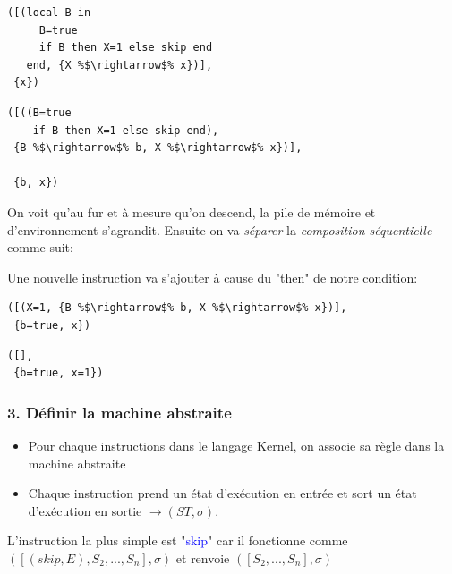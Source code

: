 \documentclass{report}
\begin{document}
\begin{minipage}[t]{0.45\linewidth}
\begin{lstlisting}[escapechar=\%]
([(local B in
     B=true
     if B then X=1 else skip end
   end, {X %$\rightarrow$% x})],
 {x})
\end{lstlisting}
\end{minipage}
%
\begin{minipage}[t]{0.45\linewidth}
\begin{lstlisting}[escapechar=\%]
([((B=true
    if B then X=1 else skip end),
 {B %$\rightarrow$% b, X %$\rightarrow$% x})],
 
 {b, x})
\end{lstlisting}
\end{minipage}

On voit qu'au fur et à mesure qu'on descend, la pile de mémoire et d'environnement s'agrandit. Ensuite on va \textit{séparer} la \textit{composition séquentielle} comme suit:

Une nouvelle instruction va s'ajouter à cause du "then" de notre condition:

\begin{minipage}[t]{0.45\linewidth}
\begin{lstlisting}[escapechar=\%]
([(X=1, {B %$\rightarrow$% b, X %$\rightarrow$% x})],
 {b=true, x})
\end{lstlisting}
\end{minipage}
%
\begin{minipage}[t]{0.45\linewidth}
\begin{lstlisting}[escapechar=\%]
([],
 {b=true, x=1})
\end{lstlisting}
\end{minipage}

\subsubsection{3. Définir la machine abstraite}
\begin{itemize}
\item Pour chaque instructions dans le langage Kernel, on associe sa règle dans la machine abstraite
\item Chaque instruction prend un état d'exécution en entrée et sort un état d'exécution en sortie $\rightarrow (ST, \sigma)$.
\end{itemize}
L'instruction la plus simple est "\textcolor{blue}{skip}" car il fonctionne comme $([(skip, E), S_2, ..., S_n], \sigma)$ et renvoie $([S_2,..., S_n], \sigma)$ 
\end{document}
